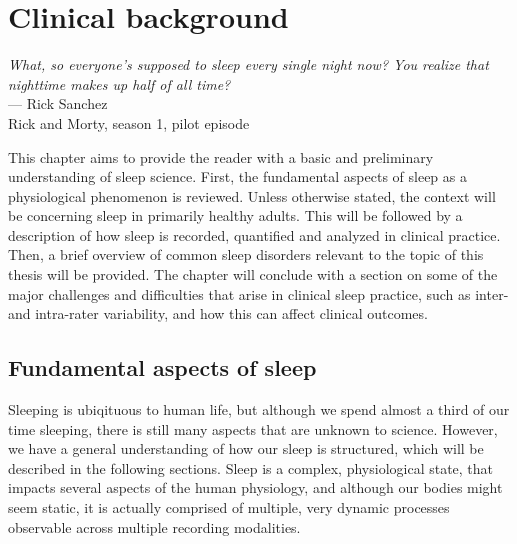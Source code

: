 \acresetall
\chapter{Clinical background}\label{chap:clinical-background}
\begin{flushright}{\slshape 
        What, so everyone’s supposed to sleep every single night now? You realize that nighttime makes up half of all time?} \\ \medskip
        --- Rick Sanchez\\Rick and Morty, season 1, pilot episode
\end{flushright}
\vspace{6cm}
    
    This chapter aims to provide the reader with a basic and preliminary understanding of sleep science. 
    First, the fundamental aspects of sleep as a physiological phenomenon is reviewed. Unless otherwise stated, the context will be concerning sleep in primarily healthy adults. 
    This will be followed by a description of how sleep is recorded, quantified and analyzed in clinical practice.
    Then, a brief overview of common sleep disorders relevant to the topic of this thesis will be provided.
    The chapter will conclude with a section on some of the major challenges and difficulties that arise in clinical sleep practice, such as inter- and intra-rater variability, and how this can affect clinical outcomes.
    
    \section{Fundamental aspects of sleep}\label{sec:fundamental-aspects-sleep}
    
        Sleeping is ubiqituous to human life, but although we spend almost a third of our time sleeping, there is still many aspects that are unknown to science. 
        However, we have a general understanding of how our sleep is structured, which will be described in the following sections. 
        Sleep is a complex, physiological state, that impacts several aspects of the human physiology, and although our bodies might seem static, it is actually comprised of multiple, very dynamic processes observable across multiple recording modalities.
        
